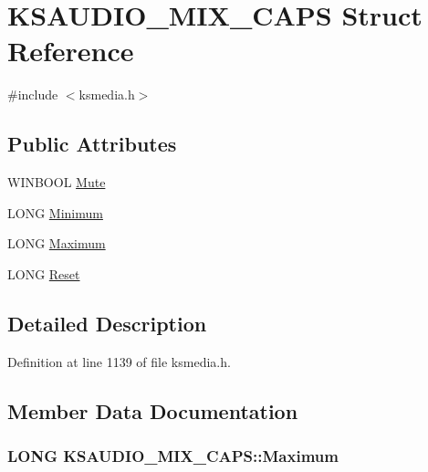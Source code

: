\hypertarget{struct_k_s_a_u_d_i_o___m_i_x___c_a_p_s}{}\section{K\+S\+A\+U\+D\+I\+O\+\_\+\+M\+I\+X\+\_\+\+C\+A\+PS Struct Reference}
\label{struct_k_s_a_u_d_i_o___m_i_x___c_a_p_s}


{\ttfamily \#include $<$ksmedia.\+h$>$}

\subsection*{Public Attributes}
\begin{DoxyCompactItemize}
\item 
W\+I\+N\+B\+O\+OL \hyperlink{struct_k_s_a_u_d_i_o___m_i_x___c_a_p_s_aa86b0f3f756461f2b71013f163dd0358}{Mute}
\item 
L\+O\+NG \hyperlink{struct_k_s_a_u_d_i_o___m_i_x___c_a_p_s_ab40d5db38802d87ef93397a589ca149f}{Minimum}
\item 
L\+O\+NG \hyperlink{struct_k_s_a_u_d_i_o___m_i_x___c_a_p_s_afa5b8076d314b642c8dcc48a5371c009}{Maximum}
\item 
L\+O\+NG \hyperlink{struct_k_s_a_u_d_i_o___m_i_x___c_a_p_s_ac9ce6f4a7cfffab8480f50ba73dfc2fd}{Reset}
\end{DoxyCompactItemize}


\subsection{Detailed Description}


Definition at line 1139 of file ksmedia.\+h.



\subsection{Member Data Documentation}
\subsubsection[{\texorpdfstring{Maximum}{Maximum}}]{\setlength{\rightskip}{0pt plus 5cm}L\+O\+NG K\+S\+A\+U\+D\+I\+O\+\_\+\+M\+I\+X\+\_\+\+C\+A\+P\+S\+::\+Maximum}\hypertarget{struct_k_s_a_u_d_i_o___m_i_x___c_a_p_s_afa5b8076d314b642c8dcc48a5371c009}{}\label{struct_k_s_a_u_d_i_o___m_i_x___c_a_p_s_afa5b8076d314b642c8dcc48a5371c009}


